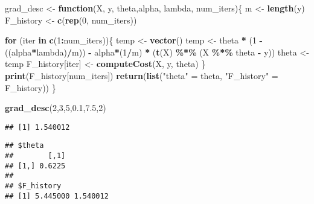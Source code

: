 \documentclass[
]{article}
\newenvironment{Shaded}{\begin{snugshade}}{\end{snugshade}}
\newcommand{\ConstantTok}[1]{\textcolor[rgb]{0.56,0.35,0.01}{#1}}
\newcommand{\ControlFlowTok}[1]{\textcolor[rgb]{0.13,0.29,0.53}{\textbf{#1}}}
\newcommand{\DecValTok}[1]{\textcolor[rgb]{0.00,0.00,0.81}{#1}}
\newcommand{\DocumentationTok}[1]{\textcolor[rgb]{0.56,0.35,0.01}{\textbf{\textit{#1}}}}
\newcommand{\FloatTok}[1]{\textcolor[rgb]{0.00,0.00,0.81}{#1}}
\newcommand{\FunctionTok}[1]{\textcolor[rgb]{0.13,0.29,0.53}{\textbf{#1}}}
\newcommand{\NormalTok}[1]{#1}
\newcommand{\OtherTok}[1]{\textcolor[rgb]{0.56,0.35,0.01}{#1}}
\newcommand{\SpecialCharTok}[1]{\textcolor[rgb]{0.81,0.36,0.00}{\textbf{#1}}}
\newcommand{\StringTok}[1]{\textcolor[rgb]{0.31,0.60,0.02}{#1}}
\begin{document}
\begin{Shaded}
\begin{Highlighting}[]
\NormalTok{grad\_desc }\OtherTok{\textless{}{-}} \ControlFlowTok{function}\NormalTok{(X, y, theta,alpha, lambda, num\_iters)\{}
\NormalTok{m }\OtherTok{\textless{}{-}} \FunctionTok{length}\NormalTok{(y)}
\NormalTok{F\_history }\OtherTok{\textless{}{-}} \FunctionTok{c}\NormalTok{(}\FunctionTok{rep}\NormalTok{(}\DecValTok{0}\NormalTok{, num\_iters))}

\ControlFlowTok{for}\NormalTok{ (iter }\ControlFlowTok{in} \FunctionTok{c}\NormalTok{(}\DecValTok{1}\SpecialCharTok{:}\NormalTok{num\_iters))\{}
\NormalTok{  temp }\OtherTok{\textless{}{-}} \FunctionTok{vector}\NormalTok{()}
\NormalTok{  temp }\OtherTok{\textless{}{-}}\NormalTok{ theta }\SpecialCharTok{*}\NormalTok{ (}\DecValTok{1} \SpecialCharTok{{-}}\NormalTok{ ((alpha}\SpecialCharTok{*}\NormalTok{lambda)}\SpecialCharTok{/}\NormalTok{m)) }\SpecialCharTok{{-}}\NormalTok{ alpha}\SpecialCharTok{*}\NormalTok{(}\DecValTok{1}\SpecialCharTok{/}\NormalTok{m) }\SpecialCharTok{*}\NormalTok{   (}\FunctionTok{t}\NormalTok{(X) }\SpecialCharTok{\%*\%}\NormalTok{ (X }\SpecialCharTok{\%*\%}\NormalTok{ theta }\SpecialCharTok{{-}}\NormalTok{ y))}
\NormalTok{  theta }\OtherTok{\textless{}{-}}\NormalTok{ temp}
\NormalTok{  F\_history[iter] }\OtherTok{\textless{}{-}} \FunctionTok{computeCost}\NormalTok{(X, y, theta)}
\NormalTok{\}}
\FunctionTok{print}\NormalTok{(F\_history[num\_iters])}
\FunctionTok{return}\NormalTok{(}\FunctionTok{list}\NormalTok{(}\StringTok{"theta"} \OtherTok{=}\NormalTok{ theta, }\StringTok{"F\_history"} \OtherTok{=}\NormalTok{ F\_history))}
\NormalTok{\}}

\FunctionTok{grad\_desc}\NormalTok{(}\DecValTok{2}\NormalTok{,}\DecValTok{3}\NormalTok{,}\DecValTok{5}\NormalTok{,}\FloatTok{0.1}\NormalTok{,}\FloatTok{7.5}\NormalTok{,}\DecValTok{2}\NormalTok{)}
\end{Highlighting}
\end{Shaded}

\begin{verbatim}
## [1] 1.540012
\end{verbatim}

\begin{verbatim}
## $theta
##        [,1]
## [1,] 0.6225
## 
## $F_history
## [1] 5.445000 1.540012
\end{verbatim}

\begin{Shaded}
\end{Shaded}
\end{document}
